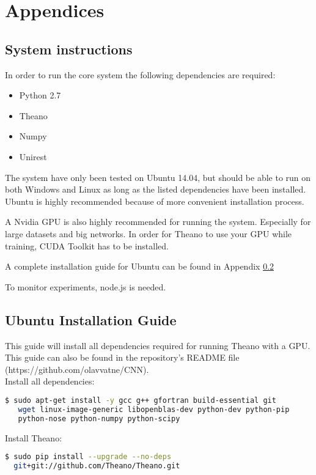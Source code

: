 \appendix
\chapter*{Appendices}
\renewcommand{\thesection}{\Alph{section}}

\section{System instructions}
In order to run the core system the following dependencies are required:
\begin{itemize}
\item Python 2.7
\item Theano
\item Numpy
\item Unirest
\end{itemize}

The system have only been tested on Ubuntu 14.04, but should be able to run on both Windows and Linux as long as the listed dependencies have been installed. Ubuntu is highly recommended because of more convenient installation process. 

A Nvidia GPU is also highly recommended for running the system. Especially for large datasets and big networks. In order for Theano to use your GPU while training, CUDA Toolkit has to be installed. 

A complete installation guide for Ubuntu can be found in Appendix \ref{app:ubuntuInstall}



To monitor experiments, node.js is needed.


\section{Ubuntu Installation Guide}
\label{app:ubuntuInstall}
This guide will install all dependencies required for running Theano with a GPU. This guide can also be found in the repository's README file (https://github.com/olavvatne/CNN).
\\

\noindent Install all dependencies:
\begin{lstlisting}[language=bash]
  $ sudo apt-get install -y gcc g++ gfortran build-essential git
   wget linux-image-generic libopenblas-dev python-dev python-pip 
   python-nose python-numpy python-scipy  
\end{lstlisting}


\noindent Install Theano:
\begin{lstlisting}[language=bash]
  $ sudo pip install --upgrade --no-deps 
  git+git://github.com/Theano/Theano.git
\end{lstlisting}


